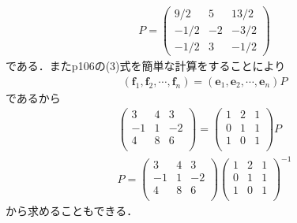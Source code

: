 \documentclass[dvipdfmx,uplatex,11pt]{jsarticle}
\theoremstyle{definition}
\begin{document}
\begin{eqnarray*}
P=
\begin{pmatrix}
9/2 & 5  & 13/2 \\
-1/2 & -2 & -3/2 \\
-1/2 & 3 & -1/2
\end{pmatrix}
\end{eqnarray*}
である．またp106の(3)式を簡単な計算をすることにより
\begin{eqnarray*}
(\bm{f}_1,\bm{f}_2,\cdots ,\bm{f}_n)=(\bm{e}_1,\bm{e}_2,\cdots ,\bm{e}_n)P
\end{eqnarray*}
であるから
\begin{eqnarray*}
\begin{pmatrix}
3 & 4 & 3 \\
-1 & 1 & -2 \\
4 & 8 & 6 \\
\end{pmatrix}
=
\begin{pmatrix}
1 & 2 & 1 \\
0 & 1 & 1 \\
1 & 0 & 1 \\
\end{pmatrix}
P \\ 
%
%
%
P=
\begin{pmatrix}
3 & 4 & 3 \\
-1 & 1 & -2 \\
4 & 8 & 6 \\
\end{pmatrix}
\begin{pmatrix}
1 & 2 & 1 \\
0 & 1 & 1 \\
1 & 0 & 1 \\
\end{pmatrix}
^{-1}
\end{eqnarray*}
から求めることもできる．\\ \\

\newpage
\end{document}
